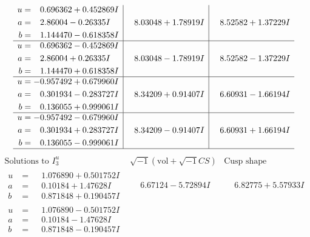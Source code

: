 \documentclass[1p]{elsarticle_modified}
\theoremstyle{definition}
\newcommand{\I}{\sqrt{-1}}
\begin{document}
$$\begin{array}{c|c|c}
\begin{aligned}
u &= \phantom{-}0.696362 + 0.452869 I \\
a &= \phantom{-}2.86004 - 0.26335 I \\
b &= \phantom{-}1.144470 - 0.618358 I\end{aligned}
 & \phantom{-}8.03048 + 1.78919 I & \phantom{-}8.52582 + 1.37229 I \\ \hline\begin{aligned}
u &= \phantom{-}0.696362 - 0.452869 I \\
a &= \phantom{-}2.86004 + 0.26335 I \\
b &= \phantom{-}1.144470 + 0.618358 I\end{aligned}
 & \phantom{-}8.03048 - 1.78919 I & \phantom{-}8.52582 - 1.37229 I \\ \hline\begin{aligned}
u &= -0.957492 + 0.679960 I \\
a &= \phantom{-}0.301934 - 0.283727 I \\
b &= \phantom{-}0.136055 + 0.999061 I\end{aligned}
 & \phantom{-}8.34209 + 0.91407 I & \phantom{-}6.60931 - 1.66194 I \\ \hline\begin{aligned}
u &= -0.957492 - 0.679960 I \\
a &= \phantom{-}0.301934 + 0.283727 I \\
b &= \phantom{-}0.136055 - 0.999061 I\end{aligned}
 & \phantom{-}8.34209 - 0.91407 I & \phantom{-}6.60931 + 1.66194 I\\
 \hline 
 \end{array}$$\newpage$$\begin{array}{c|c|c}  
\text{Solutions to }I^u_{3}& \I (\text{vol} + \sqrt{-1}CS) & \text{Cusp shape}\\
 \hline 
\begin{aligned}
u &= \phantom{-}1.076890 + 0.501752 I \\
a &= \phantom{-}0.10184 + 1.47628 I \\
b &= \phantom{-}0.871848 + 0.190457 I\end{aligned}
 & \phantom{-}6.67124 - 5.72894 I & \phantom{-}6.82775 + 5.57933 I \\ \hline\begin{aligned}
u &= \phantom{-}1.076890 - 0.501752 I \\
a &= \phantom{-}0.10184 - 1.47628 I \\
b &= \phantom{-}0.871848 - 0.190457 I\end{aligned}

\end{array}$$
\end{document}
